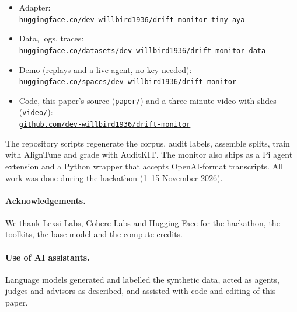 \documentclass[11pt]{article}
\begin{document}
\begin{itemize}\itemsep0pt\raggedright
\item Adapter:\\ \href{https://huggingface.co/dev-willbird1936/drift-monitor-tiny-aya}{\nolinkurl{huggingface.co/dev-willbird1936/drift-monitor-tiny-aya}}
\item Data, logs, traces:\\ \href{https://huggingface.co/datasets/dev-willbird1936/drift-monitor-data}{\nolinkurl{huggingface.co/datasets/dev-willbird1936/drift-monitor-data}}
\item Demo (replays and a live agent, no key needed):\\ \href{https://huggingface.co/spaces/dev-willbird1936/drift-monitor}{\nolinkurl{huggingface.co/spaces/dev-willbird1936/drift-monitor}}
\item Code, this paper's source (\texttt{paper/}) and a three-minute video with slides (\texttt{video/}):\\ \href{https://github.com/dev-willbird1936/drift-monitor}{\nolinkurl{github.com/dev-willbird1936/drift-monitor}}
\end{itemize}
The repository scripts regenerate the corpus, audit labels, assemble splits, train with AlignTune and grade with AuditKIT. The monitor also ships as a Pi agent extension and a Python wrapper that accepts OpenAI-format transcripts. All work was done during the hackathon (1--15 November 2026).

\paragraph{Acknowledgements.} We thank Lexsi Labs, Cohere Labs and Hugging Face for the hackathon, the toolkits, the base model and the compute credits.

\paragraph{Use of AI assistants.} Language models generated and labelled the synthetic data, acted as agents, judges and advisors as described, and assisted with code and editing of this paper.
\end{document}
